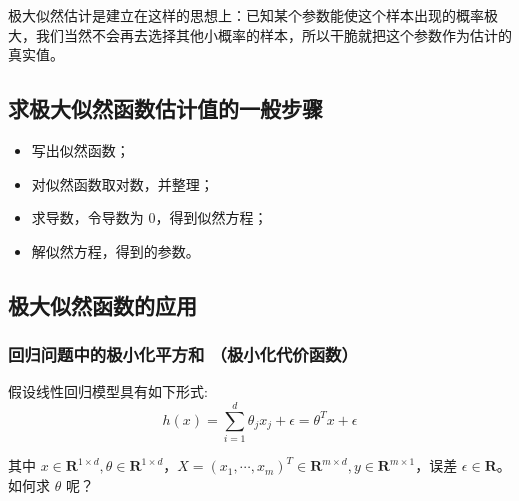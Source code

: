 \documentclass[12pt]{article}
\begin{document}
极大似然估计是建立在这样的思想上：已知某个参数能使这个样本出现的概率极大，我们当然不会再去选择其他小概率的样本，所以干脆就把这个参数作为估计的真实值。

\subsection{求极大似然函数估计值的一般步骤}
\begin{itemize}
\setlength{\itemsep}{0pt}
\setlength{\parsep}{0pt}
\setlength{\parskip}{0pt}
    \item 写出似然函数；
    \item 对似然函数取对数，并整理；
    \item 求导数，令导数为 0，得到似然方程；
    \item 解似然方程，得到的参数。
\end{itemize}

\subsection{极大似然函数的应用}
\subsubsection{回归问题中的极小化平方和 （极小化代价函数）}
假设线性回归模型具有如下形式: 
$$
h(x) = \sum_{i=1}^d\theta_jx_j + \epsilon = \theta^Tx + \epsilon
$$

其中 $x \in \mathbf{R}^{1\times d}, \theta \in \mathbf{R}^{1\times d}$，$X = (x_1, \cdots, x_m)^T \in \mathbf{R}^{m\times d}, y \in \mathbf{R}^{m \times 1}$，误差 $\epsilon \in \mathbf{R}$。如何求 $\theta$ 呢？
\end{document}

